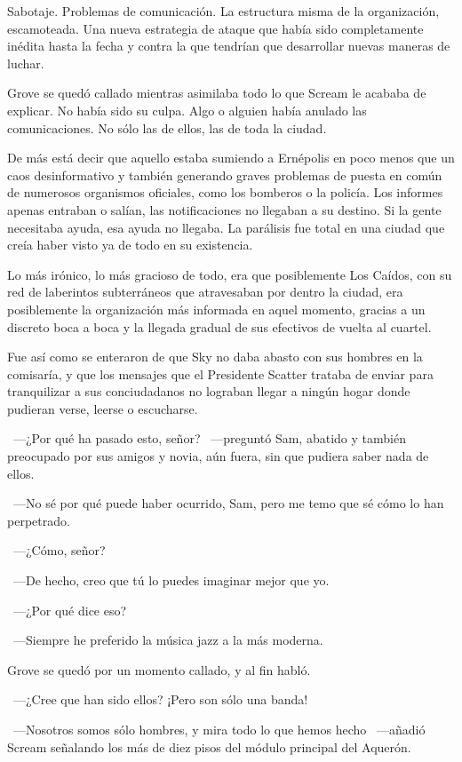 Sabotaje. Problemas de comunicación. La estructura misma de la organización, escamoteada. Una nueva estrategia de ataque que había sido completamente inédita hasta la fecha y contra la que tendrían que desarrollar nuevas maneras de luchar.

\fancyparbreak
Grove se quedó callado mientras asimilaba todo lo que Scream le acababa de explicar. No había sido su culpa. Algo o alguien había anulado las comunicaciones. No sólo las de ellos, las de toda la ciudad.

De más está decir que aquello estaba sumiendo a Ernépolis en poco menos que un caos desinformativo y también generando graves problemas de puesta en común de numerosos organismos oficiales, como los bomberos o la policía. Los informes apenas entraban o salían, las notificaciones no llegaban a su destino. Si la gente necesitaba ayuda, esa ayuda no llegaba. La parálisis fue total en una ciudad que creía haber visto ya de todo en su existencia.

Lo más irónico, lo más gracioso de todo, era que posiblemente Los Caídos, con su red de laberintos subterráneos que atravesaban por dentro la ciudad, era posiblemente la organización más informada en aquel momento, gracias a un discreto boca a boca y la llegada gradual de sus efectivos de vuelta al cuartel.

Fue así como se enteraron de que Sky no daba abasto con sus hombres en la comisaría, y que los mensajes que el Presidente Scatter trataba de enviar para tranquilizar a sus conciudadanos no lograban llegar a ningún hogar donde pudieran verse, leerse o escucharse.

~---¿Por qué ha pasado esto, señor? ~---preguntó Sam, abatido y también preocupado por sus amigos y novia, aún fuera, sin que pudiera saber nada de ellos.

~---No sé por qué puede haber ocurrido, Sam, pero me temo que sé cómo lo han perpetrado.

~---¿Cómo, señor?

~---De hecho, creo que tú lo puedes imaginar mejor que yo.

~---¿Por qué dice eso?

~---Siempre he preferido la música jazz a la más moderna.

Grove se quedó por un momento callado, y al fin habló.

~---¿Cree que han sido ellos? ¡Pero son sólo una banda!

~---Nosotros somos sólo hombres, y mira todo lo que hemos hecho ~---añadió Scream señalando los más de diez pisos del módulo principal del Aquerón.

